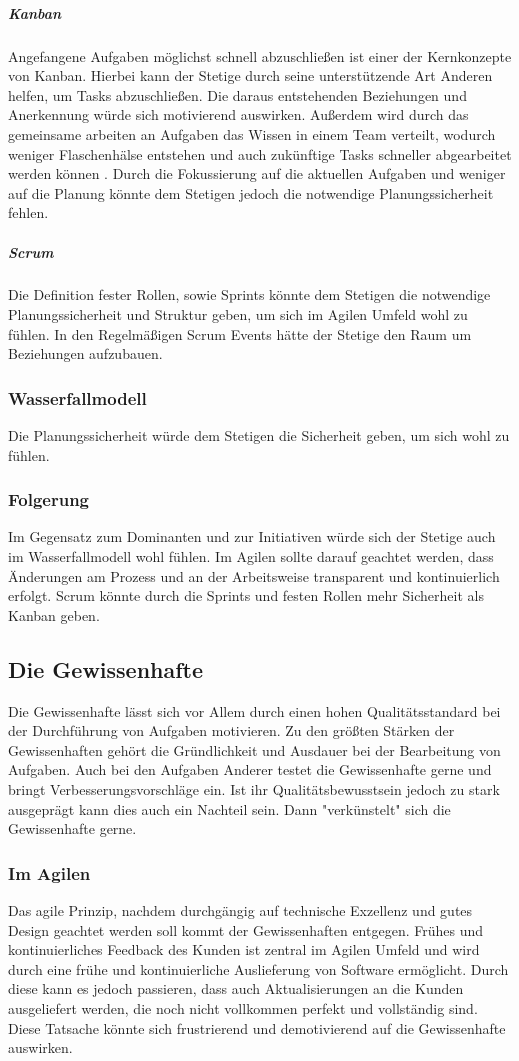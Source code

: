 \documentclass[twocolumn,10pt]{asme2ej}
\begin{document}
\subparagraph{Kanban} Angefangene Aufgaben möglichst schnell abzuschließen ist einer der Kernkonzepte von Kanban. Hierbei kann der Stetige durch seine unterstützende Art Anderen helfen, um Tasks abzuschließen. Die daraus entstehenden Beziehungen und Anerkennung würde sich motivierend auswirken. Außerdem wird durch das gemeinsame arbeiten an Aufgaben das Wissen in einem Team verteilt, wodurch weniger Flaschenhälse entstehen und auch zukünftige Tasks schneller abgearbeitet werden können \cite{kanban}. Durch die Fokussierung auf die aktuellen Aufgaben und weniger auf die Planung könnte dem Stetigen jedoch die notwendige Planungssicherheit fehlen.

\subparagraph{Scrum} Die Definition fester Rollen, sowie Sprints könnte dem Stetigen die notwendige Planungssicherheit und Struktur geben, um sich im Agilen Umfeld wohl zu fühlen. In den Regelmäßigen Scrum Events hätte der Stetige den Raum um Beziehungen aufzubauen.

\subsubsection{Wasserfallmodell}
Die Planungssicherheit würde dem Stetigen die Sicherheit geben, um sich wohl zu fühlen. 

\subsubsection{Folgerung}
Im Gegensatz zum Dominanten und zur Initiativen würde sich der Stetige auch im Wasserfallmodell wohl fühlen. Im Agilen sollte darauf geachtet werden, dass Änderungen am Prozess und an der Arbeitsweise transparent und kontinuierlich erfolgt. Scrum könnte durch die Sprints und festen Rollen mehr Sicherheit als Kanban geben. 
 
\subsection{Die Gewissenhafte}
Die Gewissenhafte lässt sich vor Allem durch einen hohen Qualitätsstandard bei der Durchführung von Aufgaben motivieren. Zu den größten Stärken der Gewissenhaften gehört die Gründlichkeit und Ausdauer bei der Bearbeitung von Aufgaben. Auch bei den Aufgaben Anderer testet die Gewissenhafte gerne und bringt Verbesserungsvorschläge ein. Ist ihr Qualitätsbewusstsein jedoch zu stark ausgeprägt kann dies auch ein Nachteil sein. Dann "verkünstelt" sich die Gewissenhafte gerne.

\subsubsection{Im Agilen}
Das agile Prinzip, nachdem durchgängig auf technische Exzellenz und gutes Design geachtet werden soll kommt der Gewissenhaften entgegen. Frühes und kontinuierliches Feedback des Kunden ist zentral im Agilen Umfeld und wird durch eine frühe und kontinuierliche Auslieferung von Software ermöglicht. Durch diese kann es jedoch passieren, dass auch Aktualisierungen an die Kunden ausgeliefert werden, die noch nicht vollkommen perfekt und vollständig sind.  Diese Tatsache könnte sich frustrierend und demotivierend auf die Gewissenhafte auswirken.
\end{document}
